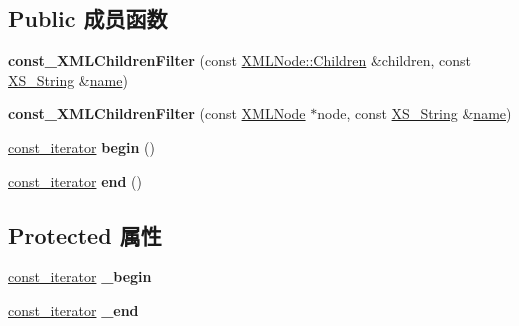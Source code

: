 \subsection*{Public 成员函数}
\begin{DoxyCompactItemize}
\item 
\mbox{\label{struct_x_m_l_storage_1_1const___x_m_l_children_filter_a0b9a29a44366e9407b0592224acfcd37}} 
{\bfseries const\+\_\+\+X\+M\+L\+Children\+Filter} (const \hyperlink{struct_x_m_l_storage_1_1_x_m_l_node_1_1_children}{X\+M\+L\+Node\+::\+Children} \&children, const \hyperlink{struct_x_m_l_storage_1_1_x_s___string}{X\+S\+\_\+\+String} \&\hyperlink{structname}{name})
\item 
\mbox{\label{struct_x_m_l_storage_1_1const___x_m_l_children_filter_a4c823c48ce279cf6cc556c6bcd483cf4}} 
{\bfseries const\+\_\+\+X\+M\+L\+Children\+Filter} (const \hyperlink{struct_x_m_l_storage_1_1_x_m_l_node}{X\+M\+L\+Node} $\ast$node, const \hyperlink{struct_x_m_l_storage_1_1_x_s___string}{X\+S\+\_\+\+String} \&\hyperlink{structname}{name})
\item 
\mbox{\label{struct_x_m_l_storage_1_1const___x_m_l_children_filter_ae650e4be1d56ea9f76739b301682599e}} 
\hyperlink{struct_x_m_l_storage_1_1const___x_m_l_children_filter_1_1const__iterator}{const\+\_\+iterator} {\bfseries begin} ()
\item 
\mbox{\label{struct_x_m_l_storage_1_1const___x_m_l_children_filter_a0c2be4fcdd575afa57a2fd67cb828269}} 
\hyperlink{struct_x_m_l_storage_1_1const___x_m_l_children_filter_1_1const__iterator}{const\+\_\+iterator} {\bfseries end} ()
\end{DoxyCompactItemize}
\subsection*{Protected 属性}
\begin{DoxyCompactItemize}
\item 
\mbox{\label{struct_x_m_l_storage_1_1const___x_m_l_children_filter_af1dfd98986d302761d64c697366a111b}} 
\hyperlink{struct_x_m_l_storage_1_1const___x_m_l_children_filter_1_1const__iterator}{const\+\_\+iterator} {\bfseries \+\_\+begin}
\item 
\mbox{\label{struct_x_m_l_storage_1_1const___x_m_l_children_filter_a927ec2006c28d449c4e64e6099eb0c27}} 
\hyperlink{struct_x_m_l_storage_1_1const___x_m_l_children_filter_1_1const__iterator}{const\+\_\+iterator} {\bfseries \+\_\+end}
\end{DoxyCompactItemize}


